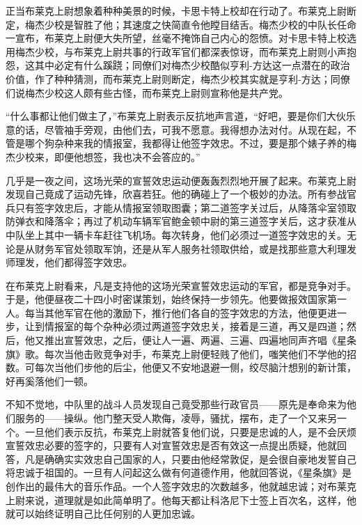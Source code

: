     正当布莱克上尉想象着种种美景的时候，卡思卡特上校却在行动了。布莱克上尉断定，梅杰少校是智胜了他；其速度之快简直令他瞠目结舌。梅杰少校的中队长任命一宣布，布莱克上尉便大失所望，丝毫不掩饰自己内心的怨愤。对卡思卡特上校选用梅杰少校，与布莱克上尉共事的行政军官们都深表惊讶，而布莱克上尉则小声抱怨，这其中必定有什么蹊跷；同僚们对梅杰少校酷似亨利-方达这一点潜在的政治价值，作了种种猜测，而布莱克上尉则断定，梅杰少校其实就是亨利-方达；同僚们说梅杰少校这人颇有些古怪，而布莱克上尉则宣称他是共产党。

    “什么事都让他们做主了，”布莱克上尉表示反抗地声言道，“好吧，要是你们大伙乐意的话，尽管袖手旁观，由他们去，可我不愿意。我得想办法对付。从现在起，不管是哪个狗杂种来我的情报室，我都得让他签字效忠。不过，要是那个婊子养的梅杰少校来，即便他想签，我也决不会答应的。”

    几乎是一夜之间，这场光荣的宣誓效忠运动便轰轰烈烈地开展了起来。布莱克上尉发现自己竟成了运动先锋，欣喜若狂。他的确碰上了一个极妙的办法。所有参战官兵只有签字效忠后，才能从情报室领取图囊；第二道签字关过后，从降落伞室领取防弹衣和降落伞；再过了机动车辆军官鲍金顿中尉的第三道签字关后，这才获准从中队坐上其中一辆卡车赶往飞机场。每次转身，他们必须过一道签字效忠的关。无论是从财务军官处领取军饷，还是从军人服务社领取供给，或是找那些意大利理发师理发，他们都得签字效忠。

 


    在布莱克上尉看来，凡是支持他的这场光荣宣誓效忠运动的军官，都是竞争对手。于是，他便昼夜二十四小时密谋策划，始终保持一步领先。他要做报效国家第一人。每当其他军官在他的激励下，推行他们各自的签字效忠的方法，他便更进一步，让到情报室的每个杂种必须过两道签字效忠关，接着是三道，再又是四道；然后，他又推出宣誓效忠，之后，便让人一遍、两遍、三遍、四遍地同声齐唱《星条旗》歌。每次当他击败竞争对手，布莱克上尉便轻贱了他们，嗤笑他们不学他的招数。可每次当他们步他的后尘，他便又不安地退避一侧，绞尽脑汁想别的新计策，好再奚落他们一顿。

    不知不觉地，中队里的战斗人员发现自己竟受那些行政官员——原先是奉命来为他们服务的——操纵。他门整天受人欺侮，凌辱，骚扰，摆布，走了一个又来另一个。一旦他们表示反抗，布莱克上尉就答复他们说，只要是忠诚的人，是不会厌烦宣誓效忠必要的签字的，只要有人对宣誓效忠是否有效这一点提出质疑，他就回答，凡是确确实实效忠自己国家的人，只要由他经常敦促，是会很自豪地发誓自己将忠诚于祖国的。一旦有人问起这么做有何道德作用，他就回答说，《星条旗》是创作出的最伟大的音乐作品。一个人签字效忠的次数越多，他就越忠诚；对布莱克上尉来说，道理就是如此简单明了。他每天都让科洛尼下士签上百次名，这样，他就可以始终证明自己比任何别的人更加忠诚。

